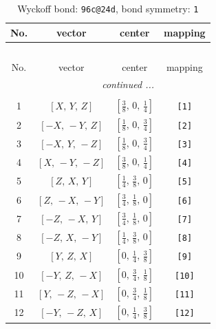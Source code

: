 \documentclass[fleqn,8pt]{jsarticle}
\begin{document}
\begin{longtable}{cccc}
\caption{Wyckoff bond: {\tt 96c@24d}, bond symmetry: {\tt 1}}
 \\
 \hline \hline
No. & vector & center & mapping \\ \hline \endfirsthead

\multicolumn{3}{l}{\tablename\ \thetable{}} \\
 \hline \hline
No. & vector & center & mapping \\ \hline \endhead

 \hline \hline
\multicolumn{3}{r}{\footnotesize\it continued ...} \\ \endfoot

 \hline \hline
\multicolumn{3}{r}{} \\ \endlastfoot

1 & $\left[ X,\, Y,\, Z \right]$ & $\left[ \frac{3}{8},\, 0,\, \frac{1}{4} \right]$ & {\tt [1]} \\ \hline
2 & $\left[ - X,\, - Y,\, Z \right]$ & $\left[ \frac{1}{8},\, 0,\, \frac{3}{4} \right]$ & {\tt [2]} \\ \hline
3 & $\left[ - X,\, Y,\, - Z \right]$ & $\left[ \frac{1}{8},\, 0,\, \frac{3}{4} \right]$ & {\tt [3]} \\ \hline
4 & $\left[ X,\, - Y,\, - Z \right]$ & $\left[ \frac{3}{8},\, 0,\, \frac{1}{4} \right]$ & {\tt [4]} \\ \hline
5 & $\left[ Z,\, X,\, Y \right]$ & $\left[ \frac{1}{4},\, \frac{3}{8},\, 0 \right]$ & {\tt [5]} \\ \hline
6 & $\left[ Z,\, - X,\, - Y \right]$ & $\left[ \frac{3}{4},\, \frac{1}{8},\, 0 \right]$ & {\tt [6]} \\ \hline
7 & $\left[ - Z,\, - X,\, Y \right]$ & $\left[ \frac{3}{4},\, \frac{1}{8},\, 0 \right]$ & {\tt [7]} \\ \hline
8 & $\left[ - Z,\, X,\, - Y \right]$ & $\left[ \frac{1}{4},\, \frac{3}{8},\, 0 \right]$ & {\tt [8]} \\ \hline
9 & $\left[ Y,\, Z,\, X \right]$ & $\left[ 0,\, \frac{1}{4},\, \frac{3}{8} \right]$ & {\tt [9]} \\ \hline
10 & $\left[ - Y,\, Z,\, - X \right]$ & $\left[ 0,\, \frac{3}{4},\, \frac{1}{8} \right]$ & {\tt [10]} \\ \hline
11 & $\left[ Y,\, - Z,\, - X \right]$ & $\left[ 0,\, \frac{3}{4},\, \frac{1}{8} \right]$ & {\tt [11]} \\ \hline
12 & $\left[ - Y,\, - Z,\, X \right]$ & $\left[ 0,\, \frac{1}{4},\, \frac{3}{8} \right]$ & {\tt [12]} \\ \hline

\end{longtable}
\end{document}
